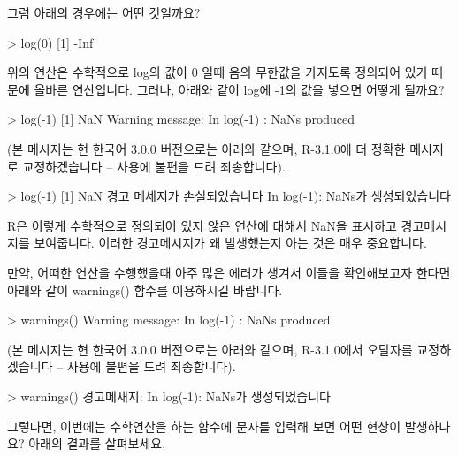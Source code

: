 그럼 아래의 경우에는 어떤 것일까요?

\begin{Schunk}
\begin{Soutput}
> log(0)
[1] -Inf
\end{Soutput}
\end{Schunk}

위의 연산은 수학적으로 log의 값이 0 일때 음의 무한값을 가지도록 정의되어 있기 때문에 올바른 연산입니다. 
그러나, 아래와 같이 log에 -1의 값을 넣으면 어떻게 될까요?

\begin{Schunk}
\begin{Soutput}
> log(-1)
[1] NaN
Warning message:
In log(-1) : NaNs produced
\end{Soutput}
\end{Schunk}

(본 메시지는 현 한국어 3.0.0 버전으로는 아래와 같으며, R-3.1.0에 더 정확한 메시지로 교정하겠습니다 -- 사용에 불편을 드려 죄송합니다).

\begin{Schunk}
\begin{Soutput}
> log(-1)
[1] NaN
경고 메세지가 손실되었습니다
In log(-1): NaNs가 생성되었습니다
\end{Soutput}
\end{Schunk}

R은 이렇게 수학적으로 정의되어 있지 않은 연산에 대해서 NaN을 표시하고 경고메시지를 보여줍니다. 
이러한 경고메시지가 왜 발생했는지 아는 것은 매우 중요합니다. 

만약, 어떠한 연산을 수행했을때 아주 많은 에러가 생겨서 이들을 확인해보고자 한다면 아래와 같이 warnings() 함수를 이용하시길 바랍니다. 

\begin{Schunk}
\begin{Soutput}
> warnings()
Warning message:
In log(-1) : NaNs produced
\end{Soutput}
\end{Schunk}

(본 메시지는 현 한국어 3.0.0 버전으로는 아래와 같으며, R-3.1.0에서 오탈자를 교정하겠습니다 -- 사용에 불편을 드려 죄송합니다).

\begin{Schunk}
\begin{Soutput}
> warnings()
경고메새지:
In log(-1): NaNs가 생성되었습니다
\end{Soutput}
\end{Schunk}


그렇다면, 이번에는 수학연산을 하는 함수에 문자를 입력해 보면 어떤 현상이 발생하나요? 
아래의 결과를 살펴보세요.

